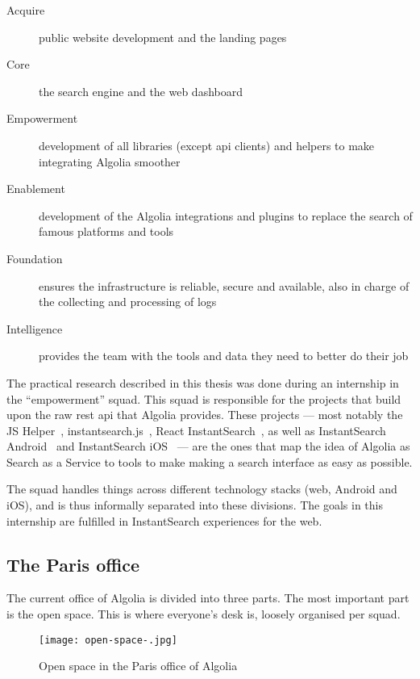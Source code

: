 \begin{description}
  \item[Acquire] public website development and the landing pages
  \item[Core] the search engine and the web dashboard
  \item[Empowerment] development of all libraries (except \acrshort{api} clients) and helpers to make integrating Algolia smoother
  \item[Enablement] development of the Algolia integrations and plugins to replace the search of famous platforms and tools
  \item[Foundation] ensures the infrastructure is reliable, secure and available, also in charge of the collecting and processing of logs
  \item[Intelligence] provides the team with the tools and data they need to better do their job
\end{description}

The practical research described in this thesis was done during an internship in the ``empowerment'' squad. This squad is responsible for the projects that build upon the raw \acrshort{rest} \acrshort{api} that Algolia provides. These projects --- most notably the JS Helper~\cite{algolia-js-helper}, instantsearch.js~\cite{instantsearch-js}, React InstantSearch~\cite{react-instantsearch}, as well as InstantSearch Android~\cite{instantsearch-android} and InstantSearch iOS~\cite{instantsearch-ios} --- are the ones that map the idea of Algolia as Search as a Service to tools to make making a  search interface as easy as possible.

The squad handles things across different technology stacks (web, Android and iOS), and is thus informally separated into these divisions. The goals in this internship are fulfilled in InstantSearch experiences for the web.

\subsection{The Paris office} %
\label{ssec:the_paris_office}

The current office of Algolia is divided into three parts. The most important part is the open space. This is where everyone's desk is, loosely organised per squad.

\begin{figure}[H]
  \centering
  \texttt{[image: open-space-.jpg]}
  \caption{Open space in the Paris office of Algolia}
  \label{figure:algolia-open-space}
\end{figure}

